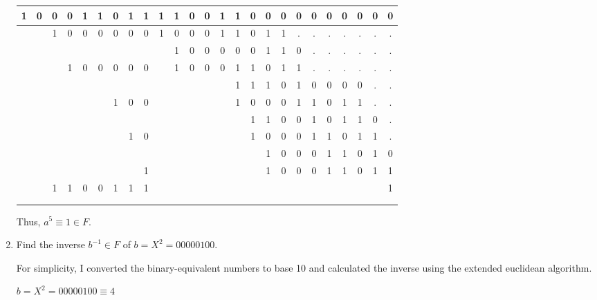 \begin{problem}
\begin{enumerate}
\begin{Answer}
\color{zaffre}
\begin{tabular}{c@{\,}c@{\,}c@{\,}c@{\,}c@{\,}c@{\,}c@{\,}c@{\,}c@{\,} | c@{\,}c@{\,}c@{\,}c@{\,}c@{\,}c@{\,}c@{\,}c@{\,}c@{\,}c@{\,}c@{\,}c@{\,}c@{\,}c@{\,}c@{\,}c@{\,}}
  1 & 0 & 0 & 0 & 1 & 1 & 0 & 1 & 1     & 1 & 1 & 0 & 0 & 1 & 1 & 0 & 0 & 0 & 0 & 0 & 0 & 0 & 0 & 0 & 0\\
\hline{}
    &   & 1 & 0 & 0 & 0 & 0 & 0 & 0     & 1 & 0 & 0 & 0 & 1 & 1 & 0 & 1 & 1 &.  &.  &.  &.  &.  &.  &.\\
    &   &   &   &   &   &   &   &       &   & 1 & 0 & 0 & 0 & 0 & 0 & 1 & 1 & 0 &.  &.  &.  &.  &.  &.\\
    &   &   & 1 & 0 & 0 & 0 & 0 & 0     &   & 1 & 0 & 0 & 0 & 1 & 1 & 0 & 1 & 1 &.  &.  &.  &.  &.  &.\\
    &   &   &   &   &   &   &   &       &   &   &   &   &   & 1 & 1 & 1 & 0 & 1 & 0 & 0 & 0 & 0 &.  &.\\
    &   &   &   &   &   & 1 & 0 & 0     &   &   &   &   &   & 1 & 0 & 0 & 0 & 1 & 1 & 0 & 1 & 1 &.  &.\\
    &   &   &   &   &   &   &   &       &   &   &   &   &   &   & 1 & 1 & 0 & 0 & 1 & 0 & 1 & 1 & 0 &.\\
    &   &   &   &   &   &   & 1 & 0     &   &   &   &   &   &   & 1 & 0 & 0 & 0 & 1 & 1 & 0 & 1 & 1 &.\\
    &   &   &   &   &   &   &   &       &   &   &   &   &   &   &   & 1 & 0 & 0 & 0 & 1 & 1 & 0 & 1 &0\\
    &   &   &   &   &   &   &   & 1     &   &   &   &   &   &   &   & 1 & 0 & 0 & 0 & 1 & 1 & 0 & 1 &1\\
\hline{}
    &   & 1 & 1 & 0 & 0 & 1 & 1 & 1     &   &   &   &   &   &   &   &   &   &   &   &   &   &   &   &1\\
\\
\\
\end{tabular}
\color{black}

\noindent
Thus, $a^5 \equiv 1 \in F$.
\end{Answer}

\newpage
\item Find the inverse $b^{-1} \in F$ of $b=X^2=00000100$.

\begin{Answer}

For simplicity, I converted the binary-equivalent numbers to base 10 and
calculated the inverse using the extended euclidean algorithm.

\noindent
$b=X^2=00000100 \equiv 4$


\end{Answer}
\end{enumerate}
\end{problem}
